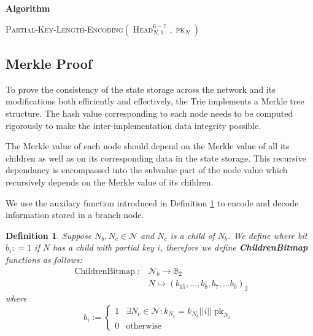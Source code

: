 \documentclass{book}
\newcommand{\assign}{:=}
\newcommand{\tmname}[1]{\textsc{#1}}
\newcommand{\tmop}[1]{\ensuremath{\operatorname{#1}}}
\newcommand{\tmstrong}[1]{\textbf{#1}}
\newcommand{\tmtextbf}[1]{{\bfseries{#1}}}
\newcommand{\tmtextup}[1]{{\upshape{#1}}}
\newenvironment{tmindent}{\begin{tmparmod}{1.5em}{0pt}{0pt}}{\end{tmparmod}}
\newenvironment{tmparmod}[3]{\begin{list}{}{\setlength{\topsep}{0pt}\setlength{\leftmargin}{#1}\setlength{\rightmargin}{#2}\setlength{\parindent}{#3}\setlength{\listparindent}{\parindent}\setlength{\itemindent}{\parindent}\setlength{\parsep}{\parskip}} \item[]}{\end{list}}
\newcounter{tmcounter}
\newcommand{\custombinding}[1]{%
  \setcounter{tmcounter}{#1}%
  \addtocounter{tmcounter}{-1}%
  \refstepcounter{tmcounter}}
\newtheorem{definition}{Definition}
\newtheorem{definition}{Definition}
\begin{document}
\custombinding{2}{\noindent}\begin{tmparmod}{0pt}{0pt}{0em}%
    \tmtextbf{Algorithm \tmtextup{2}}{\smallskip}
    
    \begin{tmindent}
      \label{algo-pk-length}{\tmname{Partial-Key-Length-Encoding$(\tmop{Head}_{N,
      1}^{6 - 7}_{}, \tmop{pk}_N)$}}
    \end{tmindent}
\end{tmparmod}{\medskip}

\subsection{Merkle Proof}\label{sect-merkl-proof}

To prove the consistency of the state storage across the network and its
modifications both efficiently and effectively, the Trie implements a Merkle
tree structure. The hash value corresponding to each node needs to be computed
rigorously to make the inter-implementation data integrity possible.

The Merkle value of each node should depend on the Merkle value of all its
children as well as on its corresponding data in the state storage. This
recursive dependancy is encompassed into the subvalue part of the node value
which recursively depends on the Merkle value of its children.

We use the auxilary function introduced in Definition
\ref{defn-children-bitmap} to encode and decode information stored in a branch
node.

\begin{definition}
  \label{defn-children-bitmap}Suppose $N_b, N_c \in \mathcal{N}$ and $N_c$ is
  a child of $N_b$. We define where bit $b_i : = 1$ if $N$ has a child with
  partial key $i$, therefore we define {\tmstrong{ChildrenBitmap}} functions
  as follows:
  \[ \begin{array}{cc}
       \tmop{ChildrenBitmap} : & \mathcal{N}_b \rightarrow \mathbb{B}_2\\
       & N \mapsto (b_{15}, \ldots, b_8, b_7, \ldots b_0)_2
     \end{array} \]
  where
  \[ b_i \assign \left\{ \begin{array}{cc}
       1 & \exists N_c \in \mathcal{N}: k_{N_c} = k_{N_b} | | i | |
       \tmop{pk}_{N_c}\\
       0 & \text{otherwise}
     \end{array} \right. \]
\end{definition}
\end{document}
